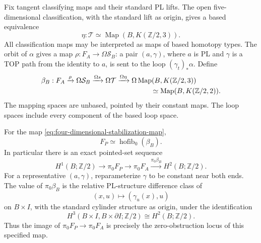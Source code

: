 Fix tangent classifying maps and their standard PL lifts.  The open
five-dimensional classification, with the standard lift as origin,
gives a based equivalence
\[
 \eta:\mathcal T\simeq
       \operatorname{Map}(B,K(\mathbb Z/2,3)).
\]
All classification maps may be interpreted as maps of based homotopy
types.  The orbit of $\alpha$ gives a map
$\rho:F_A\to\Omega\mathcal S_B$: a pair $(a,\gamma)$, where $a$ is
PL and $\gamma$ is a TOP path from the identity to $a$, is sent to
the loop $(\gamma_t)_*\alpha$.  Define
\begin{equation}\label{eq:four-dimensional-stabilization-map}
\begin{aligned}
 \beta_B:F_A&\xrightarrow{\rho}\Omega\mathcal S_B
   \xrightarrow{\Omega s}\Omega\mathcal T
   \xrightarrow{\Omega\eta}
      \Omega\operatorname{Map}(B,K(\mathbb Z/2,3))\\
 &\hspace{43mm}\simeq\operatorname{Map}(B,K(\mathbb Z/2,2)).
\end{aligned}
\end{equation}
The mapping spaces are unbased, pointed by their constant maps.
The loop spaces include every component of the based loop space.

\begin{theorem}\label{thm:four-dimensional-stabilization-fibre}
For the map \eqref{eq:four-dimensional-stabilization-map},
\begin{equation}\label{eq:four-dimensional-stabilization-hofibre}
 F_P\simeq\operatorname{hofib}_0(\beta_B).
\end{equation}
In particular there is an exact pointed-set sequence
\begin{equation}\label{eq:four-dimensional-stabilization-components}
 H^1(B;\mathbb Z/2)\longrightarrow\pi_0F_P
 \longrightarrow\pi_0F_A
 \xrightarrow{\pi_0\beta_B}H^2(B;\mathbb Z/2).
\end{equation}
For a representative $(a,\gamma)$, reparameterize $\gamma$ to be
constant near both ends.  The value of $\pi_0\beta_B$ is the
relative PL-structure difference class of
\[
 (x,u)\longmapsto(\gamma_u(x),u)
\]
on $B\times I$, with the standard cylinder structure as origin,
under the identification
\[
 H^3(B\times I,B\times\partial I;\mathbb Z/2)
       \cong H^2(B;\mathbb Z/2).
\]
Thus the image of $\pi_0F_P\to\pi_0F_A$ is precisely the
zero-obstruction locus of this specified map.
\end{theorem}

